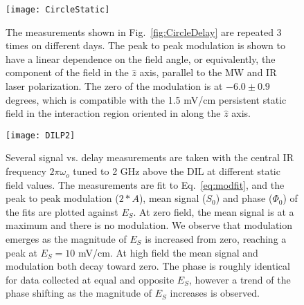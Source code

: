 \documentclass[aps,pra,preprint,groupedaddress]{revtex4-1}
\begin{document}
\begin{figure}
	\texttt{[image: CircleStatic]}
	\caption{The measurements shown in Fig.~\ref{fig:CircleDelay} are repeated 3 times on different days. The peak to peak modulation is shown to have a linear dependence on the field angle, or equivalently, the component of the field in the $\hat{z}$ axis, parallel to the MW and IR laser polarization. The zero of the modulation is at $-6.0 \pm 0.9$ degrees, which is compatible with the 1.5 mV/cm persistent static field in the interaction region oriented in along the $\hat{z}$ axis.}
	\label{fig:CircleStatic}
\end{figure}



\begin{figure}
	\texttt{[image: DILP2]}
	\caption{Several signal vs. delay measurements are taken with the central IR frequency $2\pi\omega_o$ tuned to 2 GHz above the DIL at different static field values. The measurements are fit to Eq.~\ref{eq:modfit}, and the peak to peak modulation ($2*A$), mean signal ($S_0$) and phase ($\Phi_0$) of the fits are plotted against $E_S$. At zero field, the mean signal is at a maximum and there is no modulation. We observe that modulation emerges as the magnitude of $E_S$ is increased from zero, reaching a peak at $E_S = 10$ mV/cm. At high field the mean signal and modulation both decay toward zero. The phase is roughly identical for data collected at equal and opposite $E_S$, however a trend of the phase shifting as the magnitude of $E_S$ increases is observed.}
	\label{fig:DILP2}
\end{figure}
\end{document}
